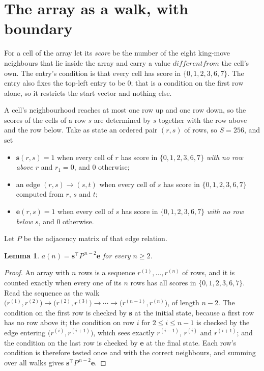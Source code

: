 \documentclass[11pt,a4paper]{article}
\theoremstyle{plain}
\newtheorem{lemma}[theorem]{Lemma}
\theoremstyle{definition}
\begin{document}
\section{The array as a walk, with boundary}

For a cell of the array let its \emph{score} be the number of the eight king-move neighbours that lie inside
the array and carry a value $different from$ the cell's own. The entry's condition is that every cell
has score in $\{0,1,2,3,6,7\}$. The entry also fixes the top-left entry to be $0$; that is a condition on the first row alone, so it restricts the start vector and nothing else.

A cell's neighbourhood reaches at most one row up and one row down, so the scores of the
cells of a row $s$ are determined by $s$ together with the row above and the row below.
Take as state an ordered pair $(r,s)$ of rows, so $S=256$, and set
\begin{itemize}
\item $\mathbf{s}(r,s)=1$ when every cell of $r$ has score in $\{0,1,2,3,6,7\}$ \emph{with no row
above $r$} and $r_1=0$, and $0$ otherwise;
\item an edge $(r,s)\to(s,t)$ when every cell of $s$ has score in $\{0,1,2,3,6,7\}$ computed from
$r$, $s$ and $t$;
\item $\mathbf{e}(r,s)=1$ when every cell of $s$ has score in $\{0,1,2,3,6,7\}$ \emph{with no row
below $s$}, and $0$ otherwise.
\end{itemize}
Let $P$ be the adjacency matrix of that edge relation.

\begin{lemma}\label{lem:walk}
$a(n)=\mathbf{s}^{\!\top}P^{\,n-2}\mathbf{e}$ for every $n\ge2$.
\end{lemma}

\begin{proof}
An array with $n$ rows is a sequence $r^{(1)},\dots,r^{(n)}$ of rows, and it is counted
exactly when every one of its $n$ rows has all scores in $\{0,1,2,3,6,7\}$. Read the sequence as the
walk $\bigl(r^{(1)},r^{(2)}\bigr)\to\bigl(r^{(2)},r^{(3)}\bigr)\to\cdots\to
\bigl(r^{(n-1)},r^{(n)}\bigr)$, of length $n-2$. The condition on the first row is
checked by $\mathbf{s}$ at the initial state, because a first row has no row above it; the
condition on row $i$ for $2\le i\le n-1$ is checked by the edge entering
$\bigl(r^{(i)},r^{(i+1)}\bigr)$, which sees exactly $r^{(i-1)}$, $r^{(i)}$ and
$r^{(i+1)}$; and the condition on the last row is checked by $\mathbf{e}$ at the final
state. Each row's condition is therefore tested once and with the correct neighbours, and
summing over all walks gives $\mathbf{s}^{\!\top}P^{\,n-2}\mathbf{e}$.
\end{proof}
\end{document}

